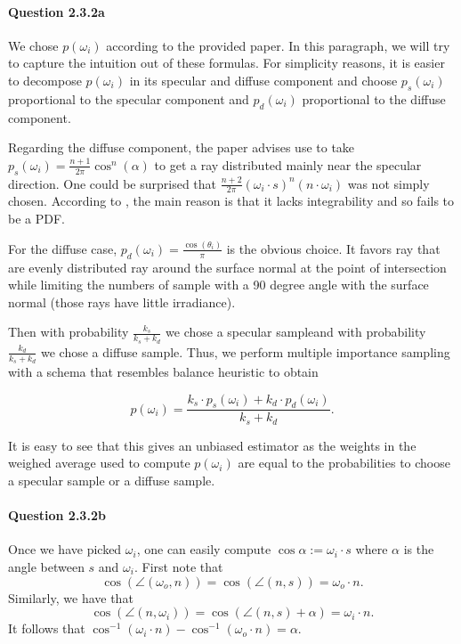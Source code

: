 \documentclass{article}
\begin{document}
\paragraph{Question 2.3.2a}
We chose $p(\omega_i)$ according to the provided paper. In this paragraph, we will try to capture the intuition out of these formulas. For simplicity reasons, it is easier to decompose $p(\omega_i)$ in its specular and diffuse component and choose $p_s(\omega_i)$ proportional to the specular component and $p_d(\omega_i)$ proportional to the diffuse component.

Regarding the diffuse component, the paper advises use to take $p_s(\omega_i) = \frac{n+1}{2\pi}\cos^n(\alpha)$ to get a ray distributed mainly near the specular direction.
One could be surprised that $\frac{n+2}{2\pi}(\omega_i \cdot s)^n(n \cdot \omega_i)$ was not simply chosen.
According to \cite{Lafortune}, the main reason is that it lacks integrability and so fails to be a PDF.

For the diffuse case, $p_d(\omega_i) = \frac{\cos(\theta_i)}{\pi}$ is the obvious choice. It favors ray that are evenly distributed ray around the surface normal at the point of intersection while limiting the numbers of sample with a 90 degree angle with the surface normal (those rays have little irradiance). 

Then with probability $\frac{k_s}{k_s + k_d}$ we chose a specular sampleand with probability $\frac{k_d}{k_s + k_d}$ we chose a diffuse sample. Thus, we perform multiple importance sampling with a schema that resembles balance heuristic to obtain

$$p(\omega_i) = \frac{k_s \cdot p_s(\omega_i) + k_d \cdot p_d(\omega_i)}{k_s + k_d}.$$

It is easy to see that this gives an unbiased estimator as the weights in the weighed average used to compute $p(\omega_i)$ are equal to the probabilities to choose a specular sample or a diffuse sample.

\paragraph{Question 2.3.2b}Once we have picked $\omega_i$, one can easily compute\linebreak 
$\cos\alpha := \omega_i \cdot s$ where $\alpha$ is the angle between $s$ and $\omega_i$. First note that $$\cos \left (\angle(\omega_o, n)\right ) = \cos \left ( \angle(n,s) \right ) = \omega_o\cdot n.$$ Similarly, we have that
$$\cos\left(\angle (n, \omega_i)\right) = \cos\left(\angle(n,s) + \alpha\right) = \omega_i \cdot n.$$
It follows that $\cos^{-1}{\left(\omega_i \cdot n\right)} - \cos^{-1}{\left(\omega_o\cdot n\right)} = \alpha.$
\end{document}
